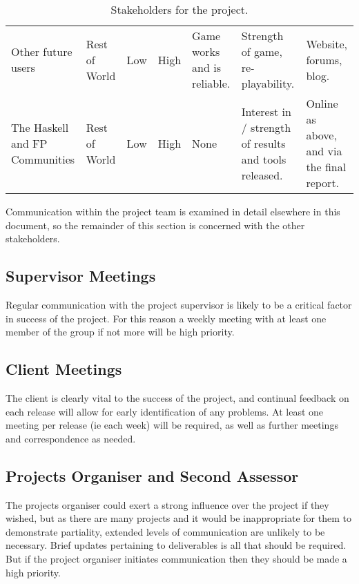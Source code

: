 \begin{table*}
\begin{tabular}{p{9em} p{5em} p{2.5em} p{2.5em} p{9em} p{9em} p{8em}}
		Other future users & Rest of World & Low & High & 
		Game works and is reliable. & 
		Strength of game, re-playability. & 
		Website, forums, blog. \\
		
		The Haskell and FP Communities & Rest of World & Low & High & 
		None & 
		Interest in  / strength of results and tools released. & 
		Online as above, and via the final report. \\
		\bottomrule
	\end{tabular}
	\vspace{1.5em}
	\caption{Stakeholders for the project.}
	\label{tab:stakeholders}
\end{table*}

\noindent Communication within the project team is examined in detail elsewhere in this document, so the remainder of this section is concerned with the other stakeholders.

\subsection{Supervisor Meetings}

Regular communication with the project supervisor is likely to be a critical factor in success of the project. For this reason a weekly meeting with at least one member of the group if not more will be high priority.

\subsection{Client Meetings}

The client is clearly vital to the success of the project, and continual feedback on each release will allow for early identification of any problems. At least one meeting per release (ie each week) will be required, as well as further meetings and correspondence as needed.

\subsection{Projects Organiser and Second Assessor}

The projects organiser could exert a strong influence over the project if they wished, but as there are many projects and it would be inappropriate for them to demonstrate partiality, extended levels of communication are unlikely to be necessary. Brief updates pertaining to deliverables is all that should be required. But if the project organiser initiates communication then they should be made a high priority.

